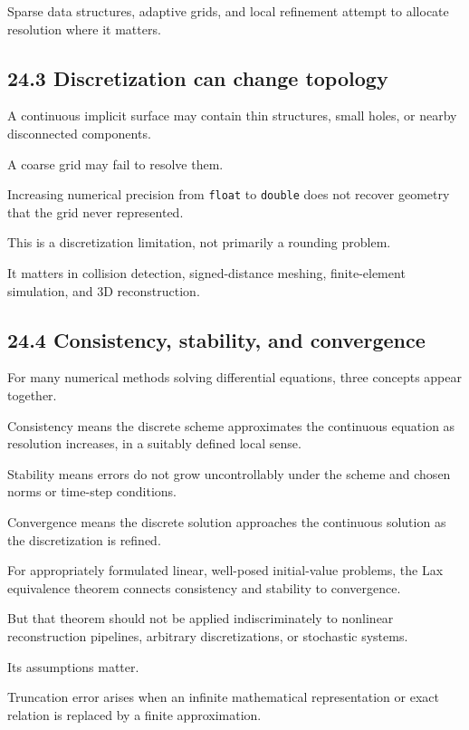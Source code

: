 Sparse data structures, adaptive grids, and local refinement attempt to allocate resolution where it matters.

\subsection{24.3 Discretization can change topology}\label{02-foundations-ii-ch029-discretization-can-change-topology}

A continuous implicit surface may contain thin structures, small holes, or nearby disconnected components.

A coarse grid may fail to resolve them.

Increasing numerical precision from \texttt{float} to \texttt{double} does not recover geometry that the grid never represented.

This is a discretization limitation, not primarily a rounding problem.

It matters in collision detection, signed-distance meshing, finite-element simulation, and 3D reconstruction.

\subsection{24.4 Consistency, stability, and convergence}\label{02-foundations-ii-ch029-consistency-stability-and-convergence}

For many numerical methods solving differential equations, three concepts appear together.

Consistency means the discrete scheme approximates the continuous equation as resolution increases, in a suitably defined local sense.

Stability means errors do not grow uncontrollably under the scheme and chosen norms or time-step conditions.

Convergence means the discrete solution approaches the continuous solution as the discretization is refined.

For appropriately formulated linear, well-posed initial-value problems, the Lax equivalence theorem connects consistency and stability to convergence.

But that theorem should not be applied indiscriminately to nonlinear reconstruction pipelines, arbitrary discretizations, or stochastic systems.

Its assumptions matter.

Truncation error arises when an infinite mathematical representation or exact relation is replaced by a finite approximation.

